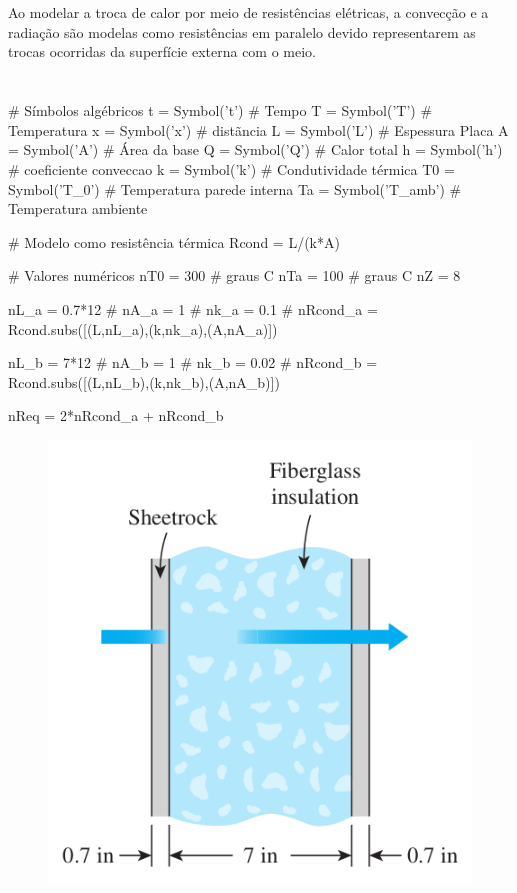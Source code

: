 \documentclass[a4paper,11pt]{article}
\begin{document}
\section{} %
\paragraph{}Ao modelar a troca de calor por meio de resistências elétricas, a convecção e a radiação são modelas como resistências em paralelo devido representarem as trocas ocorridas da superfície externa com o meio.

\section{} %

\begin{sympycode}
# Símbolos algébricos
t = Symbol('t') # Tempo
T = Symbol('T') # Temperatura
x = Symbol('x') # distãncia
L = Symbol('L') # Espessura Placa
A = Symbol('A') # Área da base
Q = Symbol('Q') # Calor total
h = Symbol('h') # coeficiente conveccao
k = Symbol('k') # Condutividade térmica
T0 = Symbol('T_0') # Temperatura parede interna
Ta = Symbol('T_amb') # Temperatura ambiente

# Modelo como resistência térmica
Rcond = L/(k*A)

# Valores numéricos
nT0 = 300 # graus C
nTa = 100 # graus C
nZ = 8

nL_a = 0.7*12 #
nA_a = 1 #
nk_a = 0.1 #
nRcond_a = Rcond.subs([(L,nL_a),(k,nk_a),(A,nA_a)])

nL_b = 7*12 #
nA_b = 1 #
nk_b = 0.02 #
nRcond_b = Rcond.subs([(L,nL_b),(k,nk_b),(A,nA_b)])

nReq = 2*nRcond_a + nRcond_b
\end{sympycode}

\begin{figure}[H]
\centering
\includegraphics[width = 0.6\linewidth]{./image/lista1/q10}
\end{figure}
\end{document}
